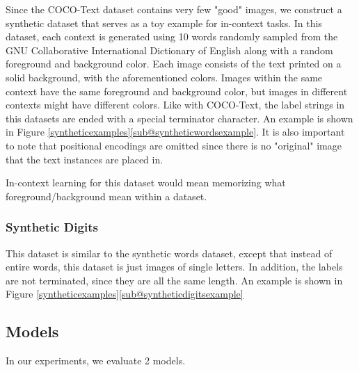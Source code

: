 Since the COCO-Text dataset contains very few "good" images, we construct a
synthetic dataset that serves as a toy example for in-context tasks.
In this dataset, each context is generated using 10 words randomly sampled from
the GNU Collaborative International Dictionary of English\cite{gcide} along with
a random foreground and background color.
Each image consists of the text printed on a solid background, with the
aforementioned colors.
Images within the same context have the same foreground and background color,
but images in different contexts might have different colors.
Like with COCO-Text, the label strings in this datasets are ended with a special
terminator character.
An example is shown in Figure \ref{syntheticexamples}\ref{sub@syntheticwordsexample}.
It is also important to note that positional encodings are omitted since there
is no "original" image that the text instances are placed in.

In-context learning for this dataset would mean memorizing what
foreground/background mean within a dataset.

\subsubsection{Synthetic Digits}
This dataset is similar to the synthetic words dataset, except that instead of
entire words, this dataset is just images of single letters.
In addition, the labels are not terminated, since they are all the same length.
An example is shown in Figure \ref{syntheticexamples}\ref{sub@syntheticdigitsexample}

\subsection{Models}
In our experiments, we evaluate 2 models.

